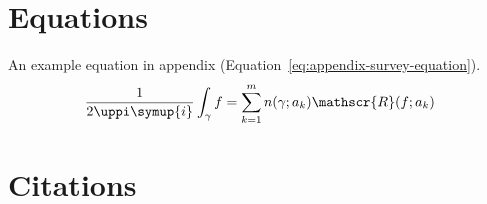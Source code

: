 \begin{survey}
\section{Equations}

An example equation in appendix (Equation~\eqref{eq:appendix-survey-equation}).
\begin{equation}
  \frac{1}{2 \uppi \symup{i}} \int_\gamma f = \sum_{k=1}^m n(\gamma; a_k) \mathscr{R}(f; a_k)
  \label{eq:appendix-survey-equation}
\end{equation}


\section{Citations}




% 

\printbibliography

\end{survey}
